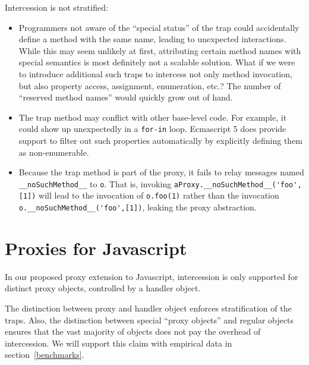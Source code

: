 \documentclass{acm_proc_article-sp}
\begin{document}
Intercession is not stratified:
\begin{itemize}
  \item Programmers not aware of the ``special status'' of the trap could accidentally define a method with the same name, leading to unexpected interactions. While this may seem unlikely at first, attributing certain method names with special semantics is most definitely not a scalable solution. What if we were to introduce additional such traps to intercess not only method invocation, but also property access, assignment, enumeration, etc.? The number of ``reserved method names'' would quickly grow out of hand.
  
  \item The trap method may conflict with other base-level code. For example, it could show up unexpectedly in a \texttt{for-in} loop. Ecmascript 5 does provide support to filter out such properties automatically by explicitly defining them as non-enumerable.
  
  \item Because the trap method is part of the proxy, it fails to relay messages named \lstinline{__noSuchMethod__} to \texttt{o}. That is, invoking \lstinline{aProxy.__noSuchMethod__('foo',[1])} will lead to the invocation of \lstinline{o.foo(1)} rather than the invocation \lstinline{o.__noSuchMethod__('foo',[1])}, leaking the proxy abstraction.
  
\end{itemize}

\section{Proxies for Javascript}
\label{sec:proxies_for_javascript}

In our proposed proxy extension to Javascript, intercession is only supported for distinct proxy objects, controlled by a handler object.

The distinction between proxy and handler object enforces stratification of the traps. Also, the distinction between special ``proxy objects'' and regular objects ensures that the vast majority of objects does not pay the overhead of intercession. We will support this claim with empirical data in section~\ref{benchmarks}.

\end{document}
